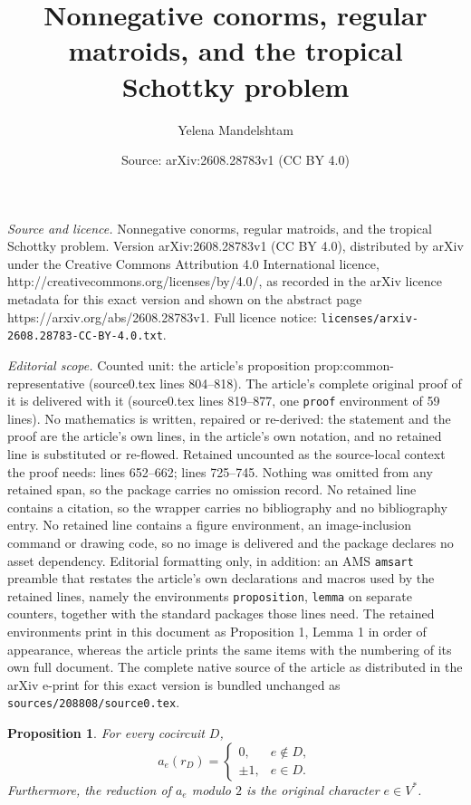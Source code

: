 \documentclass[10pt,a4paper]{amsart}
\title{Nonnegative conorms, regular matroids, and the tropical Schottky problem}
\author{Yelena Mandelshtam}
\date{Source: arXiv:2608.28783v1 (CC BY 4.0)}
\newtheorem{proposition}{Proposition}
\begin{document}
\maketitle

\noindent\emph{Source and licence.} Nonnegative conorms, regular matroids, and the tropical Schottky problem. Version arXiv:2608.28783v1 (CC BY 4.0), distributed by arXiv under the Creative Commons Attribution 4.0 International licence, http://creativecommons.org/licenses/by/4.0/, as recorded in the arXiv licence metadata for this exact version and shown on the abstract page https://arxiv.org/abs/2608.28783v1. Full licence notice: \texttt{licenses/arxiv-2608.28783-CC-BY-4.0.txt}.\par\smallskip

\noindent\textit{Editorial scope.} Counted unit: the article's proposition prop:common-representative (source0.tex lines 804--818). The article's complete original proof of it is delivered with it (source0.tex lines 819--877, one \texttt{proof} environment of 59 lines). No mathematics is written, repaired or re-derived: the statement and the proof are the article's own lines, in the article's own notation, and no retained line is substituted or re-flowed.  Retained uncounted as the source-local context the proof needs: lines 652--662; lines 725--745.  Nothing was omitted from any retained span, so the package carries no omission record.  No retained line contains a citation, so the wrapper carries no bibliography and no bibliography entry.  No retained line contains a figure environment, an image-inclusion command or drawing code, so no image is delivered and the package declares no asset dependency.  Editorial formatting only, in addition: an AMS \texttt{amsart} preamble that restates the article's own declarations and macros used by the retained lines, namely the environments \texttt{proposition}, \texttt{lemma} on separate counters, together with the standard packages those lines need.  The retained environments print in this document as Proposition 1, Lemma 1 in order of appearance, whereas the article prints the same items with the numbering of its own full document.  The complete native source of the article as distributed in the arXiv e-print for this exact version is bundled unchanged as \texttt{sources/208808/source0.tex}.
\begin{proposition}\label{prop:coedge-rule}
For every cocircuit $D$,
\begin{equation*}
  a_e(r_D)=
  \begin{cases}
    0,&e\notin D,\\
    \pm1,&e\in D.
  \end{cases}
\end{equation*}
Furthermore, the reduction of $a_e$ modulo $2$ is the original character $e\in V^*$.
\end{proposition}
\end{document}
